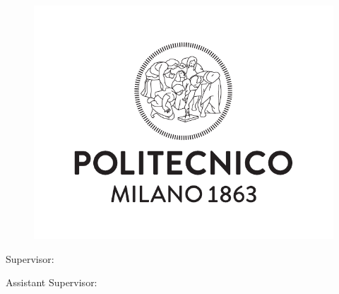 \begin{titlepage}
    \begin{center}
    	\large
        \spacedlowsmallcaps{\myUni} \\
        \bigskip\myFaculty \\
        \medskip\mySchool \\
    	\medskip\myDepartment \\
    	\bigskip\myCourseFirstPart \\
        \medskip\myCourseSecondPart \\  

        \hfill

        \vfill
        
        \begin{figure}[!h]
			\begin{center}
				\includegraphics[width=0.3\columnwidth]{Images/logoPoli.pdf} 
			\end{center}
		\end{figure}
		
		\vfill

        \begingroup
       		\huge	
            \color{Maroon} \myTitle
            \bigskip
        \endgroup

        \vfill

		\flushleft 
		\normalsize{Supervisor:}\\
		\medskip\spacedlowsmallcaps{\mySupervisor}

		\flushleft
		\normalsize{Assistant Supervisor:}\\
		\medskip\spacedlowsmallcaps{\myOtherSupervisor}\\
        

\end{center}
\end{titlepage}
